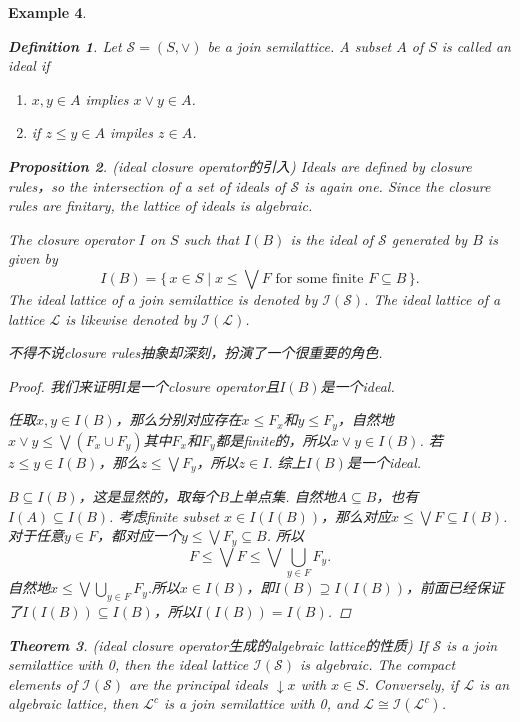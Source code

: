 \documentclass{article}
\newtheorem{theorem}{Theorem}[section]
\newtheorem{proposition}[theorem]{Proposition}
\newtheorem{example}[theorem]{Example}
\newtheorem{definition}[theorem]{Definition}
\newcommand\Set[2]{\{\,#1\mid#2\,\}} %
\newcommand\SET[2]{\Set{#1}{\text{#2}}} %
\newcommand\slattice{\mathcal{S}}
\newcommand\lattice{\mathcal{L}}
\begin{document}
\begin{example}
\newpage 
\begin{definition}
\rm Let $\slattice = (S, \vee)$ be a join semilattice. A subset $A$ of $S$  is called an {\color{red} ideal} if
\begin{enumerate}
	\item $x,y \in A$ implies $x \vee y \in A$. 
	\item if $z \leq y \in A$ impiles $z \in A$.
\end{enumerate}
\end{definition}

\begin{proposition}
\rm (ideal closure operator的引入) Ideals are defined by closure rules，so the intersection of a set of ideals of $\slattice$ is again one. Since the closure rules are finitary, {\color{red} the lattice of ideals is algebraic}. 

The closure operator $I$ on $S$ such that $I(B)$ is the ideal of $\slattice$ generated by $B$ is given by
$$
I(B) = \SET{x \in S}{$x \leq \bigvee F$ for some finite $F \subseteq B$}.
$$
The ideal lattice of a join semilattice is denoted by $\mathcal{I}(\mathcal{S})$. The ideal lattice of a lattice $\lattice$ is likewise denoted by $\mathcal{I}(\lattice)$.    
\end{proposition}

{\color{blue} 不得不说closure rules抽象却深刻，扮演了一个很重要的角色}.

\begin{proof}
{\color{red} 我们来证明$I$是一个closure operator且$I(B)$是一个ideal}. 

任取$x,y \in I(B)$，那么分别对应存在$x \leq F_x$和$y \leq F_y$，自然地$x \vee y \leq \bigvee(F_x \cup F_y)$其中$F_x$和$F_y$都是finite的，所以$x \vee y \in I(B)$. 若$z \leq y \in I(B)$，那么$z \leq \bigvee F_y$，所以$z \in I$. 综上$I(B)$是一个ideal.  


$B \subseteq I(B)$，这是显然的，取每个$B$上单点集. 自然地$A \subseteq B$，也有$I(A) \subseteq I(B)$. 考虑finite subset $x \in I(I(B))$，那么对应$x \leq  \bigvee F \subseteq I(B)$. 对于任意$y \in F$，都对应一个$ y \leq \bigvee F_y \subseteq B$. 所以
$$ 
F \leq \bigvee F \leq \bigvee \bigcup\limits_{y \in F} F_y.
$$
自然地$x \leq \bigvee \bigcup\limits_{y \in F} F_y.$所以$x \in I(B)$，即$I(B) \supseteq I(I(B))$，前面已经保证了$I(I(B)) \subseteq I(B)$，所以$I(I(B)) = I(B)$.

\end{proof}

\begin{theorem}
\rm {\color{red} (ideal closure operator生成的algebraic lattice的性质)} If $\slattice$ is a join semilattice with 0, then the ideal lattice $\mathcal{I}(\mathcal{S})$ is algebraic. The {\color{red} compact elements of $\mathcal{I}(\mathcal{S})$ are the principal ideals} $\downarrow x$ with $x \in S$. Conversely, if $\lattice$ is an algebraic lattice, then $\lattice^c$ is a join semilattice with 0, and $\lattice \cong \mathcal{I}(\lattice ^ c)$.
\end{theorem}


\end{example}
\end{document}
